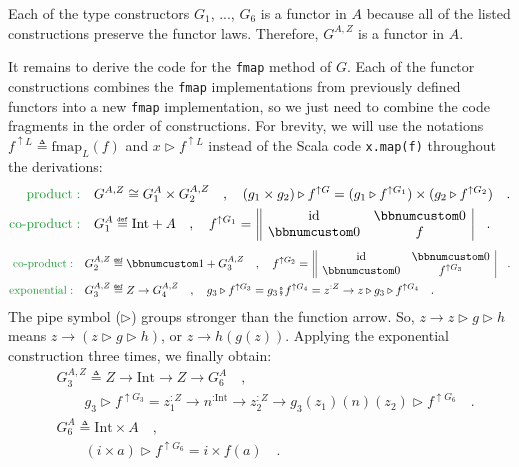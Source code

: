 Each of the type constructors $G_{1}$, ..., $G_{6}$ is a functor
in $A$ because all of the listed constructions preserve the functor
laws. Therefore, $G^{A,Z}$ is a functor in $A$.

It remains to derive the code for the \lstinline!fmap! method of
$G$. Each of the functor constructions combines the \lstinline!fmap!
implementations from previously defined functors into a new \lstinline!fmap!
implementation, so we just need to combine the code fragments in the
order of constructions. For brevity, we will use the notations $f^{\uparrow L}\triangleq\text{fmap}_{L}(f)$
and $x\triangleright f^{\uparrow L}$ instead of the Scala code \lstinline!x.map(f)!
throughout the derivations:
\begin{align*}
{\color{greenunder}\text{product}:}\quad & G^{A,Z}\cong G_{1}^{A}\times G_{2}^{A,Z}\quad,\quad(g_{1}\times g_{2})\triangleright f^{\uparrow G}=(g_{1}\triangleright f^{\uparrow G_{1}})\times(g_{2}\triangleright f^{\uparrow G_{2}})\quad.\\
{\color{greenunder}\text{co-product}:}\quad & G_{1}^{A}\triangleq\text{Int}+A\quad,\quad f^{\uparrow G_{1}}=\,\begin{array}{||cc|}
\text{id} & \bbnum 0\\
\bbnum 0 & f
\end{array}\quad.
\end{align*}
\begin{align*}
{\color{greenunder}\text{co-product}:}\quad & G_{2}^{A,Z}\triangleq\bbnum 1+G_{3}^{A,Z}\quad,\quad f^{\uparrow G_{2}}=\,\begin{array}{||cc|}
\text{id} & \bbnum 0\\
\bbnum 0 & f^{\uparrow G_{3}}
\end{array}\quad.\\
{\color{greenunder}\text{exponential}:}\quad & G_{3}^{A,Z}\triangleq Z\rightarrow G_{4}^{A,Z}\quad,\quad g_{3}\triangleright f^{\uparrow G_{3}}=g_{3}\bef f^{\uparrow G_{4}}=z^{:Z}\rightarrow z\triangleright g_{3}\triangleright f^{\uparrow G_{4}}\quad.
\end{align*}
The pipe symbol ($\triangleright$) groups stronger than the function
arrow. So, $z\rightarrow z\triangleright g\triangleright h$
means $z\rightarrow(z\triangleright g\triangleright h)$, or $z\rightarrow h(g(z))$.
Applying the exponential  construction three times, we finally obtain:
\begin{align*}
 & G_{3}^{A,Z}\triangleq Z\rightarrow\text{Int}\rightarrow Z\rightarrow G_{6}^{A}\quad,\\
 & \quad\quad g_{3}\triangleright f^{\uparrow G_{3}}=z_{1}^{:Z}\rightarrow n^{:\text{Int}}\rightarrow z_{2}^{:Z}\rightarrow g_{3}(z_{1})(n)(z_{2})\triangleright f^{\uparrow G_{6}}\quad.\\
 & G_{6}^{A}\triangleq\text{Int}\times A\quad,\\
 & \quad\quad(i\times a)\triangleright f^{\uparrow G_{6}}=i\times f(a)\quad.
\end{align*}
